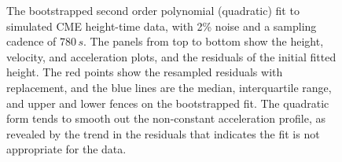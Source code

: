 \documentclass[structabstract]{aa}
\begin{document}
\begin{figure}[t]
\caption{The bootstrapped second order polynomial (quadratic) fit to simulated CME height-time data, with 2\% noise and a sampling cadence of 780$\,s$. The panels from top to bottom show the height, velocity, and acceleration plots, and the residuals of the initial fitted height. The red points show the resampled residuals with replacement, and the blue lines are the median, interquartile range, and upper and lower fences on the bootstrapped fit. The quadratic form tends to smooth out the non-constant acceleration profile, as revealed by the trend in the residuals that indicates the fit is not appropriate for the data.}
\label{fig_quadratic}
\end{figure}


\end{document}
